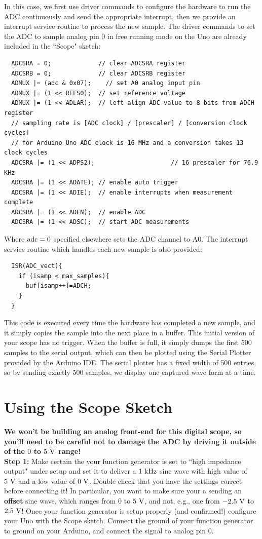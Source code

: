 \documentclass[12pt]{article}
\begin{document}
In this case, we first use driver commands to configure the hardware to run the ADC continuously and send the appropriate interrupt, then we provide an interrupt service routine to process the new sample.
The driver commands to set the ADC to sample analog pin 0 in free running mode on the Uno are already included in the ``Scope" sketch:
 \begin{verbatim}
  ADCSRA = 0;             // clear ADCSRA register
  ADCSRB = 0;             // clear ADCSRB register
  ADMUX |= (adc & 0x07);    // set A0 analog input pin
  ADMUX |= (1 << REFS0);  // set reference voltage
  ADMUX |= (1 << ADLAR);  // left align ADC value to 8 bits from ADCH register
  // sampling rate is [ADC clock] / [prescaler] / [conversion clock cycles]
  // for Arduino Uno ADC clock is 16 MHz and a conversion takes 13 clock cycles
  ADCSRA |= (1 << ADPS2);                     // 16 prescaler for 76.9 KHz
  ADCSRA |= (1 << ADATE); // enable auto trigger
  ADCSRA |= (1 << ADIE);  // enable interrupts when measurement complete
  ADCSRA |= (1 << ADEN);  // enable ADC
  ADCSRA |= (1 << ADSC);  // start ADC measurements
\end{verbatim}
Where $\rm adc=0$ specified elsewhere sets the ADC channel to A0.  The interrupt service routine which handles each new sample is also provided:
\begin{verbatim}
  ISR(ADC_vect){
    if (isamp < max_samples){
      buf[isamp++]=ADCH;
    }
  }    
\end{verbatim}
This code is executed every time the hardware has completed a new sample, and it simply copies the sample into the next place in a buffer.  This initial version of your scope has no trigger. When the buffer is full, it simply dumps the first 500 samples to the serial output, which can then be plotted using the Serial Plotter provided by the Arduino IDE.  The serial plotter has a fixed width of 500 entries, so by sending exactly 500 samples, we display one captured wave form at a time.

\section{Using the Scope Sketch}

{\bf We won't be building an analog front-end for this digital scope, so you'll need to be careful not to damage the ADC by driving it outside of the $0$ to $5~\rm{V}$ range!} \\ 

\noindent
{\bf Step 1:}  Make certain the your function generator is set to ``high impedance output" under setup and set it to deliver a $1~\rm kHz$ sine wave with high value of $5~\rm V$ and a low value of $0~\rm V$.  Double check that you have the settings correct before connecting it!  In particular, you want to make sure your a sending an {\bf offset} sine wave, which ranges from $0$ to $5~\rm V$, and not, e.g., one from $-2.5~\rm V$ to $2.5~\rm V$!   Once your function generator is setup properly (and confirmed!) configure your Uno with the Scope sketch.  Connect the ground of your function generator to ground on your Arduino, and connect the signal to analog pin 0.\\
\end{document}
